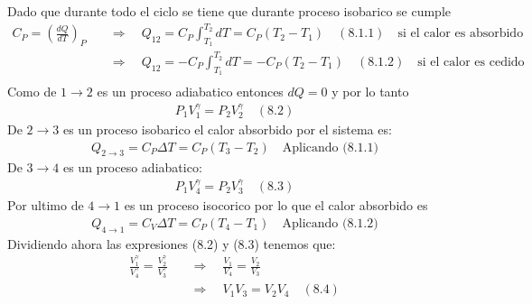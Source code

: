 \documentclass[a4paper]{article}
\begin{document}
    \begin{answer}[Punto 8]
        Dado que durante todo el ciclo se tiene que durante proceso isobarico se cumple
        \begin{align*}
            C_P = \left( \frac{dQ}{dT} \right)_P  \quad &\Rightarrow \quad Q_{12} = C_P \int _{T_1}^{T_2} dT = C_P (T_2 - T_1) \quad (8.1.1) \quad \text{si el calor es absorbido}\\
            &\Rightarrow \quad Q_{12} = -C_P \int _{T_1}^{T_2} dT = -C_P (T_2 - T_1) \quad (8.1.2) \quad \text{si el calor es cedido}\\
        \end{align*}
        Como de $1 \rightarrow 2$ es un proceso adiabatico entonces $dQ = 0$ y por lo tanto
        \begin{align*}
            P_1V_1^\gamma = P_2V_2^\gamma \quad (8.2)
        \end{align*}
        De $2 \rightarrow 3$ es un proceso isobarico el calor absorbido por el sistema es:
        \begin{align*}
            Q_{2\rightarrow 3} = C_P \Delta T = C_P (T_3 - T_2) \quad \text{Aplicando (8.1.1)}
        \end{align*}
        De $3 \rightarrow 4$ es un proceso adiabatico:
        \begin{align*}
            P_1V_4^\gamma = P_2V_3^\gamma \quad (8.3)
        \end{align*}
        Por ultimo de $4 \rightarrow 1$ es un proceso isocorico por lo que el calor absorbido es
        \begin{align*}
            Q_{4\rightarrow 1} = C_V \Delta T = C_P (T_4 - T_1) \quad \text{Aplicando (8.1.2)}
        \end{align*}
        Dividiendo ahora las expresiones (8.2) y (8.3) tenemos que:
        \begin{align*}
            \frac{V_1^\gamma}{V_4^\gamma} = \frac{V_2^\gamma}{V_3^\gamma} \quad &\Rightarrow \quad \frac{V_1}{V_4} = \frac{V_2}{V_3}\\
            & \Rightarrow \quad V_1 V_3 = V_2 V_4 \quad (8.4)
        \end{align*}


\end{answer}
\end{document}
